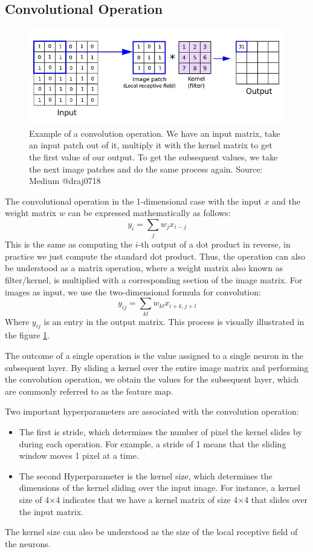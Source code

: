 \subsection{Convolutional Operation}

\begin{figure}[h]
    \centering
    \includegraphics[width=1\textwidth]{figures/convolution_operation.png}
    \caption{Example of a convolution operation. 
    We have an input matrix, take an input patch out of it, multiply it with the kernel matrix to get the first value of our output.
    To get the subsequent values, we take the next image patches and do the same process again.
    Source: Medium @draj0718}
    \label{fig:conv-op}
\end{figure}

The convolutional operation in the 1-dimensional case with the input $x$ and the weight matrix $w$ can be expressed mathematically as follows: 
$$
y_i = \sum_j w_j x_{i-j}
$$
This is the same as computing the $i$-th output of a dot product in reverse, in practice we just compute the standard dot product.
Thus, the operation can also be understood as a matrix operation, where a weight matrix also known as filter/kernel, is multiplied with a corresponding section of the image matrix.
For images as input, we use the two-dimensional formula for convolution:
$$
y_{ij} = \sum_{kl} w_{kl} x_{i+k, j+l}
$$
Where $y_{ij}$ is an entry in the output matrix.
This process is visually illustrated in the figure \ref{fig:conv-op}.

The outcome of a single operation is the value assigned to a single neuron in the subsequent layer.
By sliding a kernel over the entire image matrix and performing the convolution operation, 
we obtain the values for the subsequent layer, which are commonly referred to as the feature map.

Two important hyperparameters are associated with the convolution operation:
\begin{itemize}
    \item The first is stride, which determines the number of pixel the kernel slides by during each operation. For example, a stride of 1 means that the sliding window moves 1 pixel at a time.
    \item The second Hyperparameter is the kernel size, which determines the dimensions of the kernel sliding over the input image. For instance, a kernel size of 4×4 indicates that we have a kernel matrix of size 4×4 that slides over the input matrix.
\end{itemize}
The kernel size can also be understood as the size of the local receptive field of the neurons.


